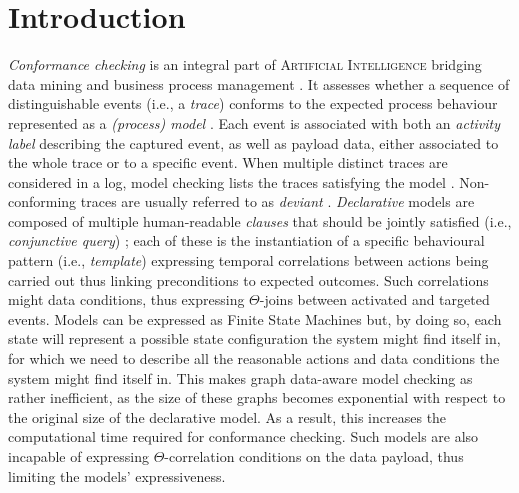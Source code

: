 \section{Introduction}

\textit{Conformance checking} is an integral part of \textsc{Artificial Intelligence} {bridging} data mining and business process management \cite{bpm21}. It assesses whether a sequence of distinguishable events (i.e., a \textit{trace}) conforms to the expected process behaviour represented as a \textit{(process) model} \cite{RozinatA08}. Each event is associated with both an \textit{activity label} describing the captured event, as well as payload data, either associated to the whole trace or to a specific event. When multiple distinct traces are considered in a log, model checking lists the %
 traces satisfying the model \cite{BurattinMS16}. Non-conforming traces  are usually referred to as \textit{deviant} \cite{bpm21}.  \textit{Declarative} models are composed of multiple human-readable \textit{clauses} that should be  jointly satisfied (i.e., \textit{conjunctive query}) \cite{Li2020}; each of these is the instantiation of a specific behavioural pattern (i.e., \textit{template}) expressing temporal correlations between actions being carried out thus linking preconditions to expected outcomes. Such correlations might %
 data conditions, thus expressing $\Theta$-joins between activated and targeted events. %
 Models
 can be %
 expressed as Finite State Machines \cite{MultiPerspective,AgostinelliBFMM21} %
 but, by doing so, each state will represent a possible state configuration the system might find itself in, for which we need to describe all the reasonable actions and data conditions the system might find itself in. This makes graph data-aware model checking as \cite{bpm21} rather inefficient, as the size of these graphs becomes exponential with respect to the original size of the declarative model. As a result, this increases the computational time required for conformance checking. Such models are also incapable of expressing $\Theta$-correlation conditions on the data payload, thus limiting the models' expressiveness.
 

